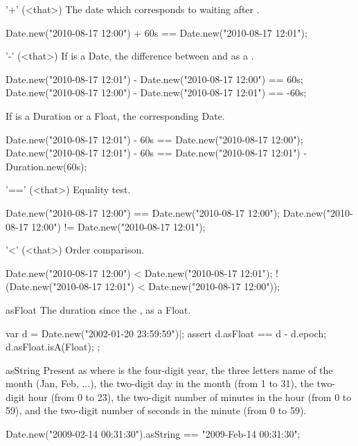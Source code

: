 \begin{urbiscriptapi}
\item['+'](<that>)%
  The date which corresponds to waiting  
  after \this.
\begin{urbiassert}
Date.new("2010-08-17 12:00") + 60s == Date.new("2010-08-17 12:01");
\end{urbiassert}

\item['-'](<that>)%
  If  is a Date, the difference between \this and  as a
  .
\begin{urbiassert}
Date.new("2010-08-17 12:01") - Date.new("2010-08-17 12:00") ==  60s;
Date.new("2010-08-17 12:00") - Date.new("2010-08-17 12:01") == -60s;
\end{urbiassert}

If  is a Duration or a Float, the corresponding Date.

\begin{urbiassert}
Date.new("2010-08-17 12:01") - 60s == Date.new("2010-08-17 12:00");
Date.new("2010-08-17 12:01") - 60s
  == Date.new("2010-08-17 12:01") - Duration.new(60s);
\end{urbiassert}

\item['=='](<that>)%
  Equality test.
\begin{urbiassert}
Date.new("2010-08-17 12:00") == Date.new("2010-08-17 12:00");
Date.new("2010-08-17 12:00") != Date.new("2010-08-17 12:01");
\end{urbiassert}

\item['<'](<that>)%
  Order comparison.
\begin{urbiassert}
   Date.new("2010-08-17 12:00") < Date.new("2010-08-17 12:01");
! (Date.new("2010-08-17 12:01") < Date.new("2010-08-17 12:00"));
\end{urbiassert}

\item[asFloat] The duration since the , as a Float.
\begin{urbiscript}
var d = Date.new("2002-01-20 23:59:59")|;
assert
{
  d.asFloat == d - d.epoch;
  d.asFloat.isA(Float);
};
\end{urbiscript}

\item[asString] Present as  where  is the four-digit
  year,  the three letters name of the month (Jan, Feb, ...),
   the two-digit day in the month (from 1 to 31),  the
  two-digit hour (from 0 to 23),  the two-digit number of minutes in
  the hour (from 0 to 59), and  the two-digit number of seconds in
  the minute (from 0 to 59).
\begin{urbiassert}
Date.new("2009-02-14 00:31:30").asString == "2009-Feb-14 00:31:30";
\end{urbiassert}


\end{urbiscriptapi}
